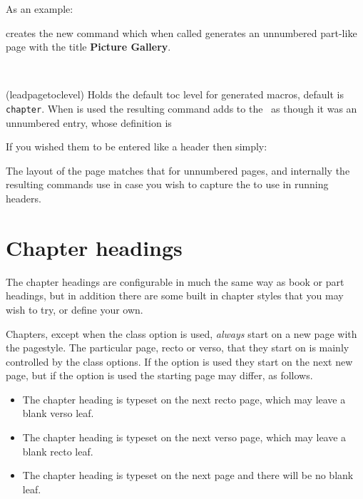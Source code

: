 As an example:
\begin{lcode}
\end{lcode}
creates the new command  which when called generates an unnumbered
part-like page with the title \textbf{Picture Gallery}.

\begin{syntax}
\cmd{\leadpagetoclevel} \\
\end{syntax}
\glossary(leadpagetoclevel)%
{}%
{Holds the default toc level for  generated macros,
default is \texttt{chapter}.}
When  is used the resulting command adds 
to the \toc\ as though it was an unnumbered \cmd{\leadpagetoclevel} entry,
whose definition is
\begin{lcode}
\newcommand*{\leadpagetoclevel}{chapter}
\end{lcode}
If you wished them to be entered like a \cmd{\part} header then simply:
\begin{lcode}
\renewcommand*{\leadpagetoclevel}{part}
\end{lcode}


    The layout of the page matches that for unnumbered \cmd{\part} pages, and 
internally the resulting commands use \cmd{\partmark} in case you 
wish to capture the  to use in running headers.



\section{Chapter headings}
\label{sec:chapter-headings}

    The chapter headings are configurable in much the same way as book or part 
headings, but in addition there are some built in chapter styles that you may
wish to try, or define your own.

    Chapters, except when the  class option is used,
 \emph{always} start on a new page with the 
pagestyle. The particular page, recto or verso, that they start on is
mainly controlled by the class options. If the  option is used
they start on the next new page, but if the  option is
used the starting page may differ, as follows.
\begin{itemize}
\item[\Lopt{openright}] The chapter heading is typeset on the next recto page,
  which may leave a blank verso leaf.
\item[\Lopt{openleft}] The chapter heading is typeset on the next verso page,
  which may leave a blank recto leaf.
\item[\Lopt{openany}] The chapter heading is typeset on the next page and there
  will be no blank leaf.
\end{itemize}

